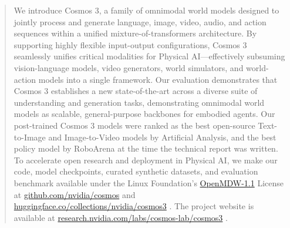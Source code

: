 \begin{abstract}
We introduce Cosmos 3, a family of omnimodal world models designed to jointly process and generate language, image, video, audio, and action sequences within a unified mixture-of-transformers architecture. By supporting highly flexible input-output configurations, Cosmos 3 seamlessly unifies critical modalities for Physical AI---effectively subsuming vision-language models, video generators, world simulators, and world-action models into a single framework. Our evaluation demonstrates that Cosmos 3 establishes a new state-of-the-art across a diverse suite of understanding and generation tasks, demonstrating omnimodal world models as scalable, general-purpose backbones for embodied agents. Our post-trained Cosmos 3 models were ranked as the best open-source Text-to-Image and Image-to-Video models by Artificial Analysis, and the best policy model by RoboArena at the time the technical report was written. To accelerate open research and deployment in Physical AI, we make our code, model checkpoints, curated synthetic datasets, and evaluation benchmark available under the Linux Foundation's \href{https://openmdw.ai/license/1-1/}{OpenMDW-1.1} License at \href{https://github.com/nvidia/cosmos}{github.com/nvidia/cosmos} and \href{https://huggingface.co/collections/nvidia/cosmos3}{huggingface.co/collections/nvidia/cosmos3} . The project website is available at \href{https://research.nvidia.com/labs/cosmos-lab/cosmos3}{research.nvidia.com/labs/cosmos-lab/cosmos3} .
\end{abstract}
